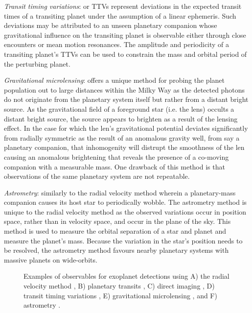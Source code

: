 \emph{Transit timing variations}: or TTVs represent deviations in the expected transit
times of a transiting planet under the assumption of a linear ephemeris. Such deviations
may be attributed to an unseen planetary companion whose gravitational influence on the
transiting planet is observable either through close encounters or mean motion resonances.
The amplitude and periodicity of a transiting planet's TTVs can be used to constrain the mass
and orbital period of the perturbing planet.

\emph{Gravitational microlensing}:
offers a unique method for probing the planet population out to large distances
within the Milky Way as the detected photons do not originate from the planetary system itself
but rather from a distant bright source. As the gravitational field of a
foreground star (i.e. the lens) occults a distant bright source, the source appears to
brighten as a result of the lensing effect. In the case for which the len's gravitational
potential deviates significantly from radially symmetric as the result of an anomalous gravity
well, from say a planetary companion, that inhomogenity will distrupt the smoothness of the
len causing an anomalous brightening that reveals the presence of a co-moving companion with
a measurable mass. One drawback of this method is that observations of the same planetary
system are not repeatable.

\emph{Astrometry}: similarly to the radial velocity method wherein a planetary-mass companion
causes its host star to periodically wobble. The astrometry method is unique to the radial velocity
method as the observed variations occur in position space, rather than in velocity space, and
occur in the plane of the sky. This method is used to measure the orbital separation of a
star and planet and measure the planet's mass. Because the variation in the star's position
needs to be resolved, the astrometry method favours nearby planetary systems with massive
planets on wide-orbits.


\begin{figure}
  \centering
  \caption{Examples of observables for exoplanet detections using A)
    the radial velocity method \citep{mayor95}, B) planetary transits
    \citep{charbonneau09}, C) direct imaging \citep{currie14},
    D) transit timing variations \citep{ballard11},
    E) gravitational microlensing \citep{beaulieu06}, and
    F) astrometry \citep{sahlmann13}.}
  \label{fig:detection}
\end{figure}


